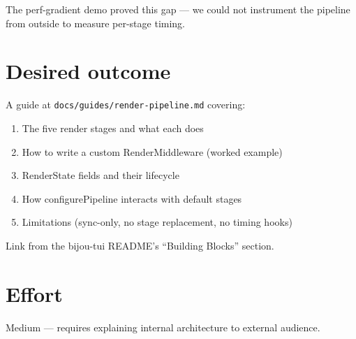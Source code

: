 

The perf-gradient demo proved this gap --- we could not instrument the pipeline from outside to measure per-stage timing.

\section{Desired outcome}\label{record-340-desired-outcome}

A guide at \texttt{d\allowbreak{}o\allowbreak{}c\allowbreak{}s\allowbreak{}/\allowbreak{}g\allowbreak{}u\allowbreak{}i\allowbreak{}d\allowbreak{}e\allowbreak{}s\allowbreak{}/\allowbreak{}r\allowbreak{}e\allowbreak{}n\allowbreak{}d\allowbreak{}e\allowbreak{}r\allowbreak{}-\allowbreak{}p\allowbreak{}i\allowbreak{}p\allowbreak{}e\allowbreak{}l\allowbreak{}i\allowbreak{}n\allowbreak{}e\allowbreak{}.\allowbreak{}m\allowbreak{}d} covering:

\begin{enumerate}
\def\labelenumi{\arabic{enumi}.}
\tightlist
\item
  The five render stages and what each does
\item
  How to write a custom RenderMiddleware (worked example)
\item
  RenderState fields and their lifecycle
\item
  How configurePipeline interacts with default stages
\item
  Limitations (sync-only, no stage replacement, no timing hooks)
\end{enumerate}

Link from the bijou-tui README's ``Building Blocks'' section.

\section{Effort}\label{record-340-effort}

Medium --- requires explaining internal architecture to external audience.

